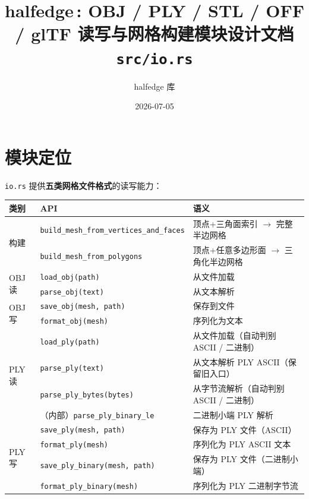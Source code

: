 \documentclass[11pt,a4paper]{article}
\title{\textbf{halfedge\,: OBJ / PLY / STL / OFF / glTF 读写与网格构建模块设计文档} \\ \large \texttt{src/io.rs}}
\author{halfedge 库}
\date{2026-07-05}
\begin{document}
\maketitle
\tableofcontents

\section{模块定位}

\texttt{io.rs} 提供\textbf{五类网格文件格式}的读写能力：

\begin{center}
\renewcommand{\arraystretch}{1.18}
\begin{tabular}{@{}lll@{}}
  \toprule
  \textbf{类别} & \textbf{API} & \textbf{语义} \\
  \midrule
  \multirow{2}{*}{构建}
    & \texttt{build\_mesh\_from\_vertices\_and\_faces} & 顶点+三角面索引 $\to$ 完整半边网格 \\
    & \texttt{build\_mesh\_from\_polygons}             & 顶点+任意多边形面 $\to$ 三角化半边网格 \\
  \midrule
  \multirow{2}{*}{OBJ 读}
    & \texttt{load\_obj(path)}    & 从文件加载 \\
    & \texttt{parse\_obj(text)}   & 从文本解析 \\
  \midrule
  \multirow{2}{*}{OBJ 写}
    & \texttt{save\_obj(mesh, path)} & 保存到文件 \\
    & \texttt{format\_obj(mesh)}     & 序列化为文本 \\
  \midrule
  \multirow{4}{*}{PLY 读}
    & \texttt{load\_ply(path)}                & 从文件加载（自动判别 ASCII / 二进制） \\
    & \texttt{parse\_ply(text)}               & 从文本解析 PLY ASCII（保留旧入口） \\
    & \texttt{parse\_ply\_bytes(bytes)}       & 从字节流解析（自动判别 ASCII / 二进制） \\
    & （内部）\texttt{parse\_ply\_binary\_le} & 二进制小端 PLY 解析 \\
  \midrule
  \multirow{4}{*}{PLY 写}
    & \texttt{save\_ply(mesh, path)}            & 保存为 PLY 文件（ASCII） \\
    & \texttt{format\_ply(mesh)}                & 序列化为 PLY ASCII 文本 \\
    & \texttt{save\_ply\_binary(mesh, path)}    & 保存为 PLY 文件（二进制小端） \\
    & \texttt{format\_ply\_binary(mesh)}        & 序列化为 PLY 二进制字节流 \\

\end{tabular}
\end{center}
\end{document}
